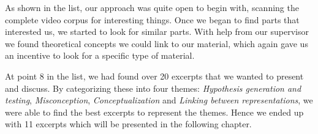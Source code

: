 As shown in the list, our approach was quite open to begin with, scanning the complete video corpus for interesting things. Once we began to find parts that interested us, we started to look for similar parts. With help from our supervisor we found theoretical concepts we could link to our material, which again gave us an incentive to look for a specific type of material.

At point 8 in the list, we had found over 20 excerpts that we wanted to present and discuss. By categorizing these into four themes: \emph{Hypothesis generation and testing}, \emph{Misconception}, \emph{Conceptualization} and \emph{Linking between representations}, we were able to find the best excerpts to represent the themes. Hence we ended up with 11 excerpts which will be presented in the following chapter.
